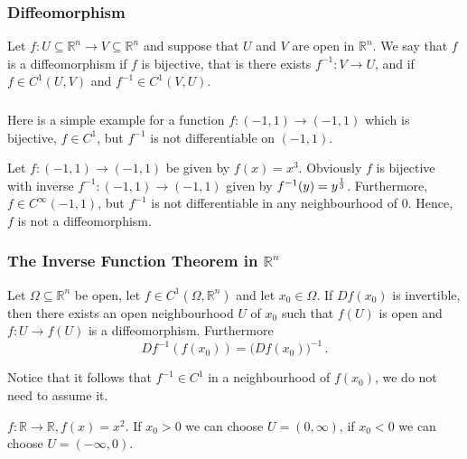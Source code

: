		

 \begin{frame}[fragile] \frametitle{Diffeomorphism}


    Let  $f \colon U \subseteq \mathbb{R}^n \rightarrow V \subseteq \mathbb{R}^n$ and suppose that
      $U$ and $ V$ are open in  $\mathbb{R}^n$. We say that $f$ is a diffeomorphism if 
	       $f$ is bijective, that is there exists  $f^{-1}: V \rightarrow U$, and if
	         $f \in C^1(U,V)$ and $ f^{-1} \in C^1(V,U)$.

		    
\end{frame}

 \begin{frame}[fragile] \frametitle{}

    Here is a simple example for a function $f\colon (-1,1) \to (-1,1)$ which is bijective,
    $f \in C^1$, but $f^{-1}$ is not differentiable on $(-1,1)$.

        Let $f\colon (-1, 1) \rightarrow (-1,1)$ be given by  $f(x) = x^3$.
	Obviously $f$ is bijective with inverse $f^{-1}  \colon (-1, 1) \rightarrow (-1,1)
	$ given by
		 $ f^{-1}(y) = y^{1 \over 3}$. Furthermore, $f \in C^{\infty}(-1,1)$, but 
		 $f^{-1}$ is not differentiable in any neighbourhood of $0$. Hence, $f$ is not a
		 diffeomorphism.

\end{frame}

 \begin{frame}[fragile] \frametitle{The Inverse Function Theorem in $\mathbb{R}^n$}

		  
		 Let $\Omega \subseteq \mathbb{R}^n$ be open, let  $f \in C^1(\Omega, \mathbb{R}^n)$ 
		 and let $x_0 \in \Omega$.
		      If  $D f(x_0)$  is invertible, then there exists an  open neighbourhood
		      $U$ of $x_0$ such that $f(U)$ is open 
and		      $f\colon U \to f(U)$ is a diffeomorphism.
Furthermore \[Df^{-1}(f(x_0)) = \big ( Df(x_0) \big)^{-1}\,.\]



				Notice that it follows that $f^{-1} \in C^1$ in a neighbourhood of $f(x_0)$, 
				we do not need to assume it.

				
				 $f\colon \mathbb{R} \to \mathbb{R}, f(x)=x^2$.
    If  $x_0 > 0$ we can choose  $U =  (0, \infty)$, if 
       $x_0 < 0$ we can choose  $U = (- \infty, 0)$.
				\end{frame}
				
